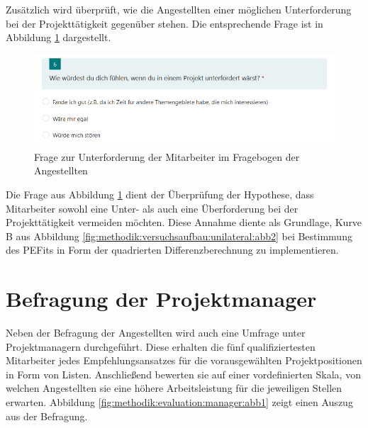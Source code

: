 Zusätzlich wird überprüft, wie die Angestellten einer möglichen Unterforderung bei der Projekttätigkeit gegenüber stehen. Die entsprechende Frage ist in Abbildung \ref{fig:methodik:evaluation:abb3} dargestellt.

\begin{figure}[h]
	\centering
	\includegraphics[width=1\textwidth]{gfx/umfrage-mitarbeiter-unterforderung.png}
	\caption{Frage zur Unterforderung der Mitarbeiter im Fragebogen der Angestellten}
	\label{fig:methodik:evaluation:abb3}
\end{figure}

Die Frage aus Abbildung \ref{fig:methodik:evaluation:abb3} dient der Überprüfung der Hypothese, dass Mitarbeiter sowohl eine Unter- als auch eine Überforderung bei der Projekttätigkeit vermeiden möchten. Diese Annahme diente als Grundlage, Kurve B aus Abbildung \ref{fig:methodik:versuchsaufbau:unilateral:abb2} bei Bestimmung des \acp{PEFit} in Form der quadrierten Differenzberechnung zu implementieren.

\section{Befragung der Projektmanager}
\label{ch:methodik:evaluation:manager}
Neben der Befragung der Angestellten wird auch eine Umfrage unter Projektmanagern durchgeführt. Diese erhalten die fünf qualifiziertesten Mitarbeiter jedes Empfehlungsansatzes für die vorausgewählten Projektpositionen in Form von Listen. Anschließend bewerten sie auf einer vordefinierten Skala, von welchen Angestellten sie eine höhere Arbeitsleistung für die jeweiligen Stellen erwarten. Abbildung \ref{fig:methodik:evaluation:manager:abb1} zeigt einen Auszug aus der Befragung.

